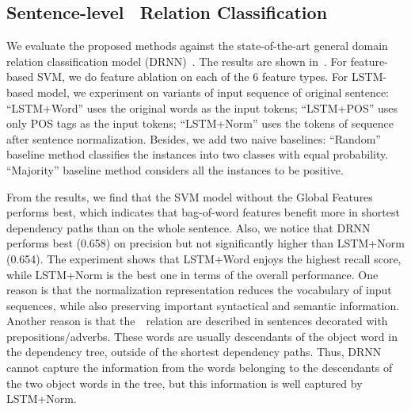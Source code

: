 \subsection{Sentence-level \lnear\ Relation Classification}
We evaluate the proposed methods against the state-of-the-art general domain relation 
classification model (DRNN)~\cite{Xu2016ImprovedRC}. 
The results are shown in~.
For feature-based SVM, we do feature ablation on each of the 6 feature types. For LSTM-based model, we experiment on variants of input sequence of original sentence:
``LSTM+Word'' uses the original words as the input tokens;
``LSTM+POS'' uses only POS tags as the input tokens; 
``LSTM+Norm'' uses the tokens of sequence after sentence normalization. 
Besides, we add two naive baselines: ``Random'' baseline method
classifies the instances into two classes with equal probability. 
``Majority'' baseline method considers all the instances to be positive.

From the results, we find that the SVM model without the Global Features performs best, which indicates that bag-of-word features benefit more in shortest dependency paths than on the whole sentence.
Also, we notice that DRNN performs best (0.658) on precision but not significantly higher than LSTM+Norm (0.654). 
The experiment shows that LSTM+Word enjoys the highest recall score, while
LSTM+Norm is the best one in terms of the overall performance. 
One reason is that the normalization representation reduces the vocabulary
of input sequences, while also preserving important syntactical 
and semantic information.  
Another reason is that the~\lnear\ relation are described in sentences decorated
with prepositions/adverbs.
These words are usually descendants of the object word in the dependency tree, 
outside of the shortest dependency paths. 
Thus, DRNN cannot capture the information from the words belonging to 
the descendants of the two object words in the tree, 
but this information is well captured by LSTM+Norm. 

